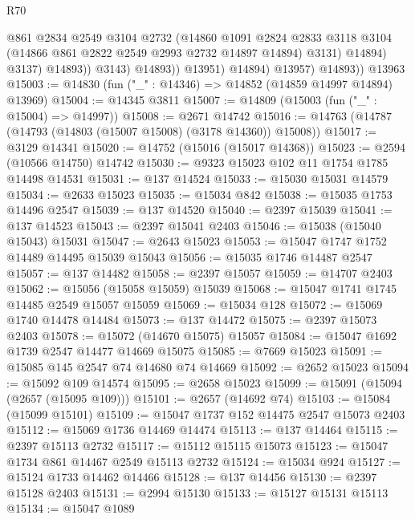 \begin{lexlean}{R70}
\begin{coremodule}
                            @861
                            @2834
                            @2549
                            @3104
                            @2732
                            (@14860
                              @1091
                              @2824
                              @2833
                              @3118
                              @3104
                              (@14866 @861 @2822 @2549 @2993 @2732 @14897 @14894)
                              @3131)
                            @14894)
                          @3137)
                        @14893))
                    @3143)
                  @14893))
              @13951)
            @14894)
          @13957)
        @14893))
    @13963
@15003 := @14830 (fun ("_" : @14346) => @14852 (@14859 @14997 @14894) @13969)
@15004 := @14345 @3811
@15007 := @14809 (@15003 (fun ("_" : @15004) => @14997))
@15008 := @2671 @14742
@15016 := @14763 (@14787 (@14793 (@14803 (@15007 @15008) (@3178 @14360)) @15008))
@15017 := @3129 @14341
@15020 := @14752 (@15016 (@15017 @14368))
@15023 := @2594 (@10566 @14750) @14742
@15030 := @9323 @15023 @102 @11 @1754 @1785 @14498 @14531
@15031 := @137 @14524
@15033 := @15030 @15031 @14579
@15034 := @2633 @15023
@15035 := @15034 @842
@15038 := @15035 @1753 @14496 @2547
@15039 := @137 @14520
@15040 := @2397 @15039
@15041 := @137 @14523
@15043 := @2397 @15041 @2403
@15046 := @15038 (@15040 @15043) @15031
@15047 := @2643 @15023
@15053 := @15047 @1747 @1752 @14489 @14495 @15039 @15043
@15056 := @15035 @1746 @14487 @2547
@15057 := @137 @14482
@15058 := @2397 @15057
@15059 := @14707 @2403
@15062 := @15056 (@15058 @15059) @15039
@15068 := @15047 @1741 @1745 @14485 @2549 @15057 @15059
@15069 := @15034 @128
@15072 := @15069 @1740 @14478 @14484
@15073 := @137 @14472
@15075 := @2397 @15073 @2403
@15078 := @15072 (@14670 @15075) @15057
@15084 := @15047 @1692 @1739 @2547 @14477 @14669 @15075
@15085 := @7669 @15023
@15091 := @15085 @145 @2547 @74 @14680 @74 @14669
@15092 := @2652 @15023
@15094 := @15092 @109 @14574
@15095 := @2658 @15023
@15099 := @15091 (@15094 (@2657 (@15095 @109)))
@15101 := @2657 (@14692 @74)
@15103 := @15084 (@15099 @15101)
@15109 := @15047 @1737 @152 @14475 @2547 @15073 @2403
@15112 := @15069 @1736 @14469 @14474
@15113 := @137 @14464
@15115 := @2397 @15113 @2732
@15117 := @15112 @15115 @15073
@15123 := @15047 @1734 @861 @14467 @2549 @15113 @2732
@15124 := @15034 @924
@15127 := @15124 @1733 @14462 @14466
@15128 := @137 @14456
@15130 := @2397 @15128 @2403
@15131 := @2994 @15130
@15133 := @15127 @15131 @15113
@15134 := @15047 @1089

\end{coremodule}
\end{lexlean}
